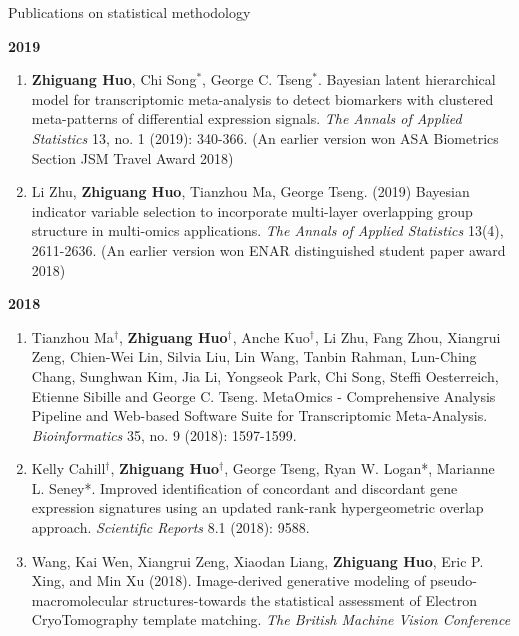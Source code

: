 \documentclass{resume} %
\begin{document}
\begin{rSection}{Publications on statistical methodology}
\begin{enumerate}[noitemsep,topsep=0pt, resume]
\end{enumerate}

\textbf{2019}
\begin{enumerate}[noitemsep,topsep=0pt,resume]

\item 
{\bf Zhiguang Huo}, Chi Song$^*$, George C. Tseng$^*$. 
Bayesian latent hierarchical model for transcriptomic meta-analysis to detect biomarkers with clustered meta-patterns of differential expression signals. \emph{The Annals of Applied Statistics} 13, no. 1 (2019): 340-366. (An earlier version won ASA Biometrics Section JSM Travel Award 2018)

\item Li Zhu, {\bf  Zhiguang Huo}, Tianzhou Ma, George Tseng. (2019)
Bayesian indicator variable selection to incorporate multi-layer overlapping group structure in multi-omics applications. 
\emph{The Annals of Applied Statistics} 13(4), 2611-2636. 
(An earlier version won ENAR distinguished student paper award 2018)

\end{enumerate}


\textbf{2018}
\begin{enumerate}[noitemsep,topsep=0pt, resume]

\item Tianzhou Ma$^\dagger$, {\bf  Zhiguang Huo$^\dagger$}, Anche Kuo$^\dagger$, Li Zhu, Fang Zhou, Xiangrui Zeng, Chien-Wei Lin, Silvia Liu, Lin Wang, Tanbin Rahman, Lun-Ching Chang, Sunghwan Kim, Jia Li, Yongseok Park, Chi Song, Steffi Oesterreich, Etienne Sibille and George C. Tseng. 
MetaOmics - Comprehensive Analysis Pipeline and Web-based Software Suite for Transcriptomic Meta-Analysis. \emph{Bioinformatics} 35, no. 9 (2018): 1597-1599. 

\item Kelly Cahill$^\dagger$, {\bf  Zhiguang Huo$^\dagger$}, George Tseng, Ryan W. Logan*, Marianne L. Seney*.
Improved identification of concordant and discordant gene expression signatures using an updated rank-rank hypergeometric overlap approach. \emph{Scientific Reports} 8.1 (2018): 9588.

\item 
Wang, Kai Wen, Xiangrui Zeng, Xiaodan Liang, {\bf Zhiguang Huo}, Eric P. Xing, and Min Xu (2018). Image-derived generative modeling of pseudo-macromolecular structures-towards the statistical assessment of Electron CryoTomography template matching. \emph{The British Machine Vision Conference}


\end{enumerate}
\end{rSection}
\end{document}
